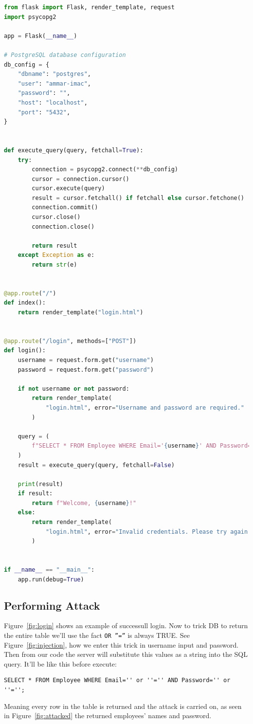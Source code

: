 \documentclass{article}
\def\c#1{\texttt{#1}}
\begin{document}
\begin{lstlisting}[language=python, caption={Login server connected to DB}]
from flask import Flask, render_template, request
import psycopg2

app = Flask(__name__)

# PostgreSQL database configuration
db_config = {
    "dbname": "postgres",
    "user": "ammar-imac",
    "password": "",
    "host": "localhost",
    "port": "5432",
}


def execute_query(query, fetchall=True):
    try:
        connection = psycopg2.connect(**db_config)
        cursor = connection.cursor()
        cursor.execute(query)
        result = cursor.fetchall() if fetchall else cursor.fetchone()
        connection.commit()
        cursor.close()
        connection.close()

        return result
    except Exception as e:
        return str(e)


@app.route("/")
def index():
    return render_template("login.html")


@app.route("/login", methods=["POST"])
def login():
    username = request.form.get("username")
    password = request.form.get("password")

    if not username or not password:
        return render_template(
            "login.html", error="Username and password are required."
        )

    query = (
        f"SELECT * FROM Employee WHERE Email='{username}' AND Password='{password}';"
    )
    result = execute_query(query, fetchall=False)

    print(result)
    if result:
        return f"Welcome, {username}!"
    else:
        return render_template(
            "login.html", error="Invalid credentials. Please try again."
        )


if __name__ == "__main__":
    app.run(debug=True)
\end{lstlisting}


\subsection{Performing Attack} %
\label{sub:Performing Attack}
Figure~\ref{fig:login} shows an example of successull login.
Now to trick DB to return the entire table we'll use the fact \c{OR ''=''} is always TRUE.
See Figure~\ref{fig:injection}, how we enter this trick in username input and password.
Then from our code the server will substitute this values as a string into the SQL query.
It'll be like this before execute:
\begin{lstlisting}
SELECT * FROM Employee WHERE Email='' or ''='' AND Password='' or ''='';
\end{lstlisting}
Meaning every row in the table is returned and the attack is carried on, as seen
in Figure~\ref{fig:attacked} the returned employees' names and password.
\end{document}
